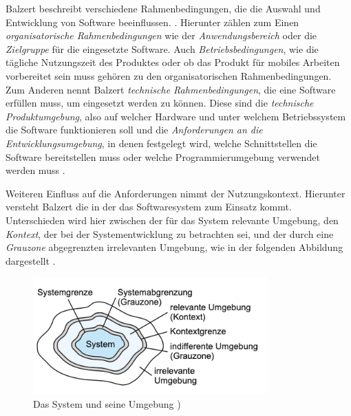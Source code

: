 Balzert beschreibt verschiedene Rahmenbedingungen, die die Auswahl und Entwicklung von Software beeinflussen. \citep[][459]{Balzert2010}.
Hierunter zählen zum Einen \textit{organisatorische Rahmenbedingungen} wie der \textit{Anwendungsbereich} oder die \textit{Zielgruppe} für die eingesetzte Software. Auch \textit{Betriebsbedingungen}, wie die tägliche Nutzungszeit des Produktes oder ob das Produkt \zb für mobiles Arbeiten vorbereitet sein muss \citep[vgl.][S. 459 f.]{Balzert2010} gehören zu den organisatorischen Rahmenbedingungen. 
Zum Anderen nennt Balzert \textit{technische Rahmenbedingungen}, die eine Software erfüllen muss, um eingesetzt werden zu können. Diese sind die \textit{technische Produktumgebung}, also auf welcher Hardware und unter welchem Betriebssystem die Software funktionieren soll und die \textit{Anforderungen an die Entwicklungsumgebung}, in denen \ua festgelegt wird, welche Schnittstellen die Software bereitstellen muss oder welche Programmierumgebung verwendet werden muss \citep[vgl.][S. 460 f.]{Balzert2010}.

Weiteren Einfluss auf die Anforderungen nimmt der Nutzungskontext. Hierunter versteht Balzert die  \citep[][461]{Balzert2010} in der das Softwaresystem zum Einsatz kommt. 
Unterschieden wird hier zwischen der für das System relevante Umgebung, den \textit{Kontext}, der bei der Systementwicklung zu betrachten sei, und der durch eine \textit{Grauzone} abgegrenzten irrelevanten Umgebung, wie in der folgenden Abbildung dargestellt \citep[vgl.][462]{Balzert2010}.

\begin{figure}[h]
  \centering
  \includegraphics[width=0.8\textwidth]{res/Anforderung1.png}
  \caption{Das System und seine Umgebung \citep[][462]{Balzert2010})}
  \label{fig:Systemumgebung}
\end{figure}

